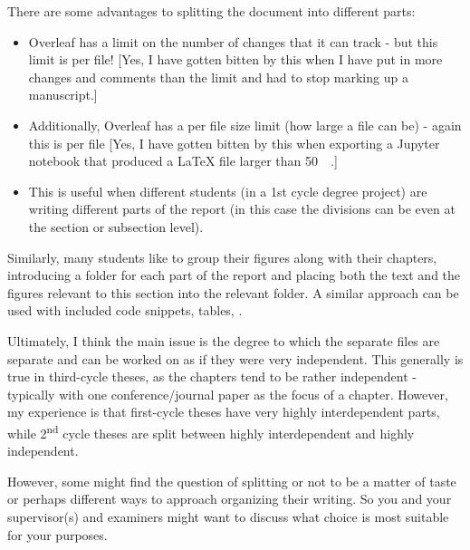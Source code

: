 \documentclass[examplethesis.tex]{subfiles}
\begin{document}
There are some advantages to splitting the document into different parts:
\begin{itemize}
\item    Overleaf has a limit on the number of changes that it can track - but this limit is per file!  [Yes, I have gotten bitten by this when I have put in more changes and comments than the limit and had to stop marking up  a manuscript.]

\item    Additionally, Overleaf has a per file size limit (\ie how large a file can be) - again this is per file [Yes, I have gotten bitten by this when exporting a Jupyter notebook that produced a LaTeX file larger than \SI{50}{\mega\byte}.]

\item    This is useful when different students (in a 1st cycle degree project) are writing different parts of the report (in this case the divisions can be even at the section or subsection level).
\end{itemize}

Similarly, many students like to group their figures along with their chapters, \ie introducing a folder for each part of the report and placing both the text and the figures relevant to this section into the relevant folder. A similar approach can be used with included code snippets, tables, \etc.

Ultimately, I think the main issue is the degree to which the separate files are separate and can be worked on as if they were very independent. This generally is true in third-cycle theses, as the chapters tend to be rather independent - typically with one conference/journal paper as the focus of a chapter. However, my experience is that first-cycle theses have very highly interdependent parts, while 2\textsuperscript{nd} cycle theses are split between highly interdependent and highly independent.

However, some might find the question of splitting or not to be a matter of taste or perhaps different ways to approach organizing their writing. So you and your supervisor(s) and examiners might want to discuss what choice is most suitable for your purposes.
\end{document}
